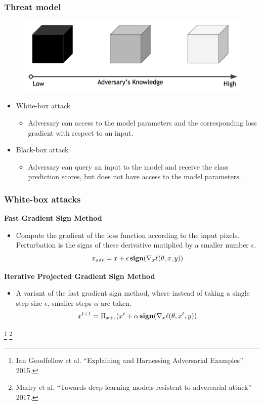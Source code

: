 \documentclass[10pt,mathserif]{beamer}
\begin{document}
\begin{frame}
\frametitle{Threat model}
\begin{figure}
    \centering
    \includegraphics[scale=0.15]{figures/threat_model.png}
    \label{fig:adversarial_attack}
\end{figure}\pause
\begin{itemize}\itemsep=12pt
    \item White-box attack
    \begin{itemize}
        \item Adversary can access to the model parameters and the corresponding loss gradient with respect to an input.
    \end{itemize}\pause
    \item Black-box attack
    \begin{itemize}
        \item Adversary can query an input to the model and receive the class prediction scores, but does not have access to the model parameters.
    \end{itemize}
\end{itemize}
\end{frame}
 

\begin{frame}
\frametitle{White-box attacks}
\textbf{Fast Gradient Sign Method}
\vspace{0.5em}
\begin{itemize}
    \item Compute the gradient of the loss function according to the input pixels. Perturbation is the signs of these derivative mutiplied by a smaller number $\epsilon$.
    \[x_{adv} = x + \epsilon \mathop{\bf sign} (\nabla_x \ell(\theta, x, y))\]
\end{itemize}\pause

\vspace{1em}
    
\textbf{Iterative Projected Gradient Sign Method}
\vspace{0.5em}
\begin{itemize}
    \item A variant of the fast gradient sign method, where instead of taking a single step size $\epsilon$, smaller steps $\alpha$ are taken.
    \[x^{t+1} = \Pi_{x+\epsilon}(x^t+\alpha \mathop{\bf sign} (\nabla_x \ell(\theta, x^t, y))\]
\end{itemize}

    \footnote{\scriptsize {\color{blue} Ian Goodfellow et al.} ``Explaining and Harnessing Adversarial Examples'' {\color{gray} 2015}.}
    \footnote{\scriptsize {\color{blue} Madry et al.} ``Towards deep learning models resistent to adversarial attack'' {\color{gray} 2017}.}
\end{frame}
\end{document}
